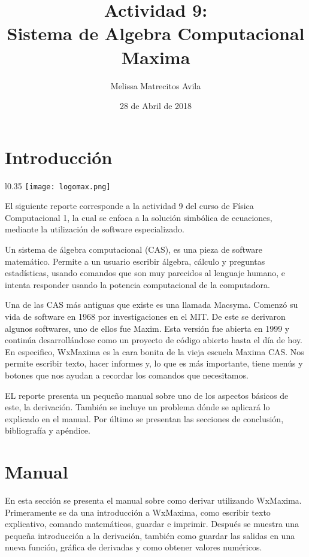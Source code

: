 \documentclass{article}
\title{Actividad 9: \\ Sistema de Algebra Computacional Maxima}
\author{Melissa Matrecitos Avila}
\date{28 de Abril de 2018}
\begin{document}
\maketitle

\section{Introducción}
\begin{wrapfigure} {l}{0.35\textwidth}
  \centering
  \texttt{[image: logomax.png]}
\end{wrapfigure}
El siguiente reporte corresponde a la actividad 9 del curso de Física Computacional 1, la cual se enfoca a la solución simbólica de ecuaciones, mediante la utilización de software especializado.

Un sistema de álgebra computacional (CAS), es una pieza de software matemático. Permite a un usuario escribir álgebra, cálculo y preguntas estadísticas, usando comandos que son muy parecidos al lenguaje humano, e intenta responder usando la potencia computacional de la computadora.

Una de las CAS más antiguas que existe es una llamada Macsyma. Comenzó su vida de software en 1968 por investigaciones en el MIT. De este se derivaron algunos softwares,  uno de ellos fue Maxim. Esta versión fue abierta en 1999  y continúa desarrollándose como un proyecto de código abierto hasta el día de hoy. En especifico, WxMaxima es la cara bonita de la vieja escuela Maxima CAS. Nos permite escribir texto, hacer informes y, lo que es más importante, tiene menús y botones que nos ayudan a recordar los comandos que necesitamos.

EL reporte presenta un pequeño manual sobre uno de los aspectos básicos de este, la derivación. También se incluye un problema dónde se aplicará lo explicado en el manual. Por último se presentan las secciones de conclusión, bibliografía y apéndice.

\section{Manual}
En esta sección se presenta el manual sobre como derivar utilizando WxMaxima. Primeramente se da una introducción a WxMaxima, como escribir texto explicativo, comando matemáticos, guardar e imprimir. Después se muestra una pequeña introducción a la derivación, también como guardar las salidas en una nueva función, gráfica de derivadas y como obtener valores numéricos.
\end{document}
